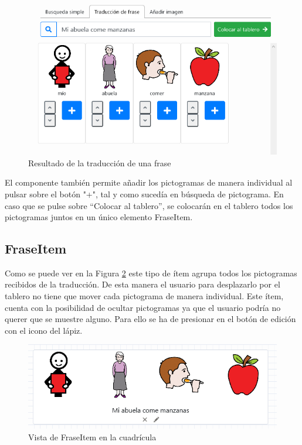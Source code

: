 \begin{figure}[h!]
	\centering
	\includegraphics[width=0.7\linewidth]{Imagenes/Bitmap/traduccionPicto}
	\caption{Resultado de la traducción de una frase}
	\label{fig:traduccionpicto}
\end{figure}


El componente también permite añadir los pictogramas de manera individual al pulsar sobre el botón "+", tal y como sucedía en búsqueda de pictograma. En caso que se pulse sobre “Colocar al tablero”, se colocarán en el tablero todos los pictogramas juntos en un único elemento FraseItem. 

\subsection{FraseItem}

Como se puede ver en la Figura \ref{fig:fraseitemoriginal} este tipo de  ítem agrupa todos los pictogramas recibidos de la traducción. De esta manera el usuario para desplazarlo por el tablero no tiene que mover cada pictograma de manera individual. Este ítem, cuenta con la posibilidad de ocultar pictogramas ya que el usuario podría no querer que se muestre alguno. Para ello se ha de presionar en el botón de edición con el icono del lápiz. 

\begin{figure}[h!]
	\centering
	\includegraphics[width=0.7\linewidth]{Imagenes/Bitmap/fraseItemOriginal}
	\caption{Vista de FraseItem en la cuadrícula}
	\label{fig:fraseitemoriginal}
\end{figure}


